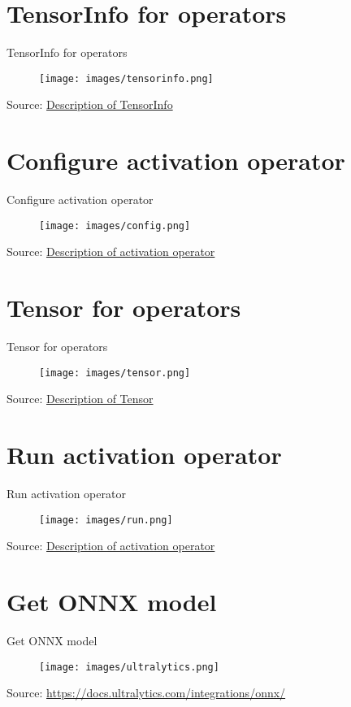 \documentclass{beamer}
\begin{document}
\section{TensorInfo for operators}
\begin{frame}{TensorInfo for operators}
  \begin{figure}[h]
    \texttt{[image: images/tensorinfo.png]}
  \end{figure}
  \footnotesize Source: \href{https://artificial-intelligence.sites.arm.com/computelibrary/latest/classarm__compute_1_1_tensor_info.xhtml}{Description of TensorInfo}
\end{frame}

\section{Configure activation operator}
\begin{frame}{Configure activation operator}
  \begin{figure}[h]
    \texttt{[image: images/config.png]}
  \end{figure}
  \footnotesize Source: \href{https://artificial-intelligence.sites.arm.com/computelibrary/latest/classarm__compute_1_1_n_e_activation_layer.xhtml}{Description of activation operator}
\end{frame}

\section{Tensor for operators}
\begin{frame}{Tensor for operators}
  \begin{figure}[h]
    \texttt{[image: images/tensor.png]}
  \end{figure}
  \footnotesize Source: \href{https://artificial-intelligence.sites.arm.com/computelibrary/latest/classarm__compute_1_1_tensor.xhtml}{Description of Tensor}
\end{frame}

\section{Run activation operator}
\begin{frame}{Run activation operator}
  \begin{figure}[h]
    \texttt{[image: images/run.png]}
  \end{figure}
  \footnotesize Source: \href{https://artificial-intelligence.sites.arm.com/computelibrary/latest/classarm__compute_1_1_n_e_activation_layer.xhtml}{Description of activation operator}
\end{frame}

\section{Get ONNX model}
\begin{frame}{Get ONNX model}
  \begin{figure}[h]
    \texttt{[image: images/ultralytics.png]}
  \end{figure}
  \footnotesize Source: \href{https://docs.ultralytics.com/integrations/onnx/}{https://docs.ultralytics.com/integrations/onnx/}
\end{frame}
\end{document}
